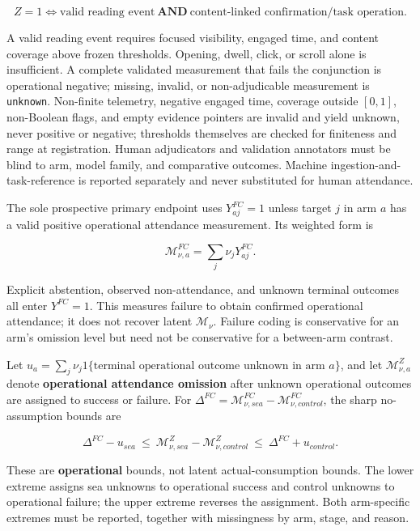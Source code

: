\documentclass[
  11pt]{article}
\begin{document}
\[Z=1\iff \text{valid reading event}\ \mathbf{AND}\ \text{content-linked confirmation/task operation}.\]

A valid reading event requires focused visibility, engaged time, and
content coverage above frozen thresholds. Opening, dwell, click, or
scroll alone is insufficient. A complete validated measurement that
fails the conjunction is operational negative; missing, invalid, or
non-adjudicable measurement is \texttt{unknown}. Non-finite telemetry,
negative engaged time, coverage outside \([0,1]\), non-Boolean flags,
and empty evidence pointers are invalid and yield unknown, never
positive or negative; thresholds themselves are checked for finiteness
and range at registration. Human adjudicators and validation annotators
must be blind to arm, model family, and comparative outcomes. Machine
ingestion-and-task-reference is reported separately and never
substituted for human attendance.

The sole prospective primary endpoint uses \(Y^{FC}_{aj}=1\) unless
target \(j\) in arm \(a\) has a valid positive operational attendance
measurement. Its weighted form is

\[\mathcal M^{FC}_{\nu,a}=\sum_j\nu_jY^{FC}_{aj}.\tag{5}\]

Explicit abstention, observed non-attendance, and unknown terminal
outcomes all enter \(Y^{FC}=1\). This measures failure to obtain
confirmed operational attendance; it does not recover latent
\(\mathcal M_\nu\). Failure coding is conservative for an arm's omission
level but need not be conservative for a between-arm contrast.

Let
\(u_a=\sum_j\nu_j1\{\text{terminal operational outcome unknown in arm }a\}\),
and let \(\mathcal M_{\nu,a}^{Z}\) denote \textbf{operational attendance
omission} after unknown operational outcomes are assigned to success or
failure. For
\(\Delta^{FC}=\mathcal M^{FC}_{\nu,sea}-\mathcal M^{FC}_{\nu,control}\),
the sharp no-assumption bounds are

\[\Delta^{FC}-u_{sea}\ \le\ \mathcal M_{\nu,sea}^{Z}-\mathcal M_{\nu,control}^{Z}\ \le\ \Delta^{FC}+u_{control}.\tag{6}\]

These are \textbf{operational} bounds, not latent actual-consumption
bounds. The lower extreme assigns sea unknowns to operational success
and control unknowns to operational failure; the upper extreme reverses
the assignment. Both arm-specific extremes must be reported, together
with missingness by arm, stage, and reason.
\end{document}
